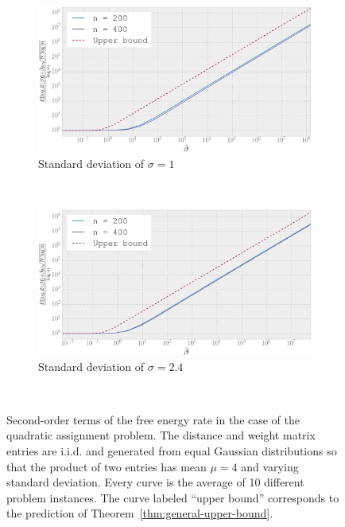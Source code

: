 \begin{figure}[ht!]
    \centering
    \begin{subfigure}[b]{.7\textwidth}
        \label{fig:qa_fe_1}
        \includegraphics[width=\textwidth]{figures/ch_free_energy/tr_qa_m4_std1_n200,400_iter20_rand62098}
        \caption{Standard deviation of $\sigma=1$}
    \end{subfigure}
    \\[.5cm]
    \begin{subfigure}[b]{.7\textwidth}
        \label{fig:qa_fe_2.4}
        \includegraphics[width=\textwidth]{figures/ch_free_energy/tr_qa_m4_std2-4_n200,400_iter10_rand30942}
        \caption{Standard deviation of $\sigma=2.4$}
    \end{subfigure}
    \\[.5cm]
    \caption{Second-order terms of the free energy rate in the case of the
    quadratic assignment problem. The distance and weight matrix entries are
    i.i.d. and generated from equal Gaussian distributions so that the product
    of two entries has mean $\mu=4$ and varying standard deviation. Every curve
    is the average of 10 different problem instances. The curve labeled ``upper
    bound'' corresponds to the prediction of Theorem~\ref{thm:general-upper-bound}.}
    \label{fig:qa_fe}
\end{figure}

